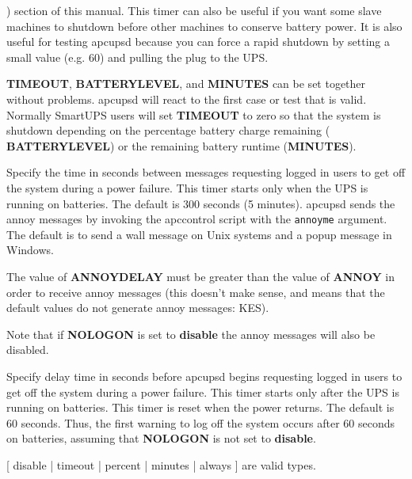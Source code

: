 {{{{{{{\begin{description}
) section of this manual. 
This timer can also be useful if you want some slave machines to shutdown
before other machines to conserve battery power.  It is also useful for
testing apcupsd because you can force a rapid shutdown by setting a small
value (e.g.  60) and pulling the plug to the UPS.  

{\bf TIMEOUT}, {\bf BATTERYLEVEL}, and {\bf MINUTES} can be set together
without problems.  apcupsd will react to the first case or test that is valid.
Normally SmartUPS users will set {\bf TIMEOUT} to zero so that the system is
shutdown depending on the percentage battery charge remaining ({\bf
BATTERYLEVEL}) or the remaining battery runtime ({\bf MINUTES}).  

\item [ANNOY \lt{}time in seconds\gt{}]
   Specify the time in seconds between messages requesting logged in users to get
off the system during a power failure. This timer starts only when the UPS is
running on batteries. The default is 300 seconds (5 minutes). apcupsd sends
the annoy messages by invoking the apccontrol script with the {\tt annoyme}
argument. The default is to send a wall message on Unix systems and a popup
message in Windows.  

The value of {\bf ANNOYDELAY} must be greater than the value of {\bf ANNOY} in
order to receive annoy messages (this doesn't make sense, and means that the
default values do not generate annoy messages: KES).  

Note that if {\bf NOLOGON} is set to {\bf disable} the annoy messages will
also be disabled.  

\item [ANNOYDELAY \lt{}time in seconds\gt{}]
   Specify delay time in seconds before apcupsd begins requesting logged in users
to get off the system during a power failure. This timer starts only after the
UPS is running on batteries. This timer is reset when the power returns. The
default is 60 seconds. Thus, the first warning to log off the system occurs
after 60 seconds on batteries, assuming that {\bf NOLOGON} is not set to {\bf
disable}.  

\item [NOLOGON \lt{}specifies when apcupsd should prevent user
   logins\gt{}]
[ disable | timeout | percent | minutes | always ] are valid types.  


\end{description}}}}}}}}
